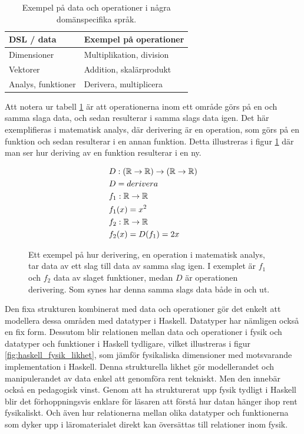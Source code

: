 \begin{draft}
\begin{table}[tph]
\centering
\caption{Exempel på data och operationer i några domänspecifika språk.}
\label{tab:data_och_ops}
\begin{tabular}{@{}l|l@{}}
\toprule
DSL / data & Exempel på operationer \\ \midrule
Dimensioner & Multiplikation, division \\
Vektorer & Addition, skalärprodukt \\
Analys, funktioner & Derivera, multiplicera \\ \bottomrule
\end{tabular}
\end{table}

Att notera ur tabell \ref{tab:data_och_ops} är att operationerna inom ett område görs på en och samma slaga data, och sedan resulterar i samma slags data igen. Det här exemplifieras i matematisk analys, där derivering är en operation, som görs på en funktion och sedan resulterar i en annan funktion. Detta illustreras i figur \ref{fig:analys_op_exempel} där man ser hur deriving av en funktion resulterar i en ny.

\begin{figure}[tph]
\begin{mdframed}
  \vspace{-0.5cm}
\begin{align*}
  &D : (\mathbb{R} \rightarrow \mathbb{R}) \rightarrow (\mathbb{R} \rightarrow \mathbb{R}) \\
  &D = derivera \\
  &f_1 : \mathbb{R} \rightarrow \mathbb{R} \\
  &f_1(x) = x^2 \\
  &f_2 : \mathbb{R} \rightarrow \mathbb{R} \\
  &f_2(x) = D(f_1) = 2x
\end{align*}
\end{mdframed}
\caption{Ett exempel på hur derivering, en operation i matematisk analys, tar data av ett slag till data av samma slag igen. I exemplet är $f_1$ och $f_2$ data av slaget funktioner, medan $D$ är operationen derivering. Som synes har denna samma slags data både in och ut.}
\label{fig:analys_op_exempel}
\end{figure}

Den fixa strukturen kombinerat med data och operationer gör det enkelt att
modellera dessa områden med datatyper i Haskell. Datatyper har nämligen också en
fix form. Dessutom blir relationen mellan data och operationer i fysik och
datatyper och funktioner i Haskell tydligare, vilket illustreras i  figur \ref{fig:haskell_fysik_likhet}, som jämför fysikaliska dimensioner med motsvarande implementation i Haskell. Denna strukturella likhet gör
modellerandet och manipulerandet av data enkel att genomföra rent tekniskt. Men
den innebär också en pedagogisk vinst. Genom att ha strukturerat upp fysik
tydligt i Haskell blir det förhoppningsvis enklare för läsaren att förstå hur
datan hänger ihop rent fysikaliskt. Och även hur relationerna mellan olika
datatyper och funktionerna som dyker upp i läromaterialet direkt kan översättas
till relationer inom fysik.


\end{draft}
